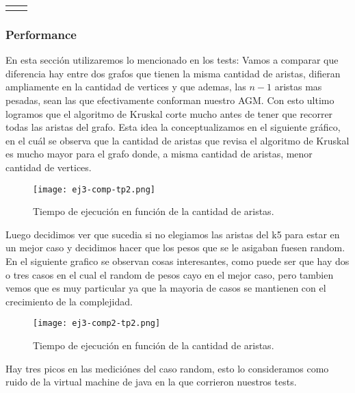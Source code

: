     
    \begin{tabular}{ l c }
    &  \\
\end{tabular}
    
    
    
\pagebreak
\subsubsection{Performance}
En esta secci\'on utilizaremos lo mencionado en los tests: Vamos a comparar que diferencia hay entre dos grafos que tienen la misma cantidad de aristas, difieran ampliamente en la cantidad de vertices y que ademas, las  $n-1$ aristas mas pesadas, sean las que efectivamente conforman nuestro AGM. Con esto ultimo logramos que el algoritmo de Kruskal corte mucho antes de tener que recorrer todas las aristas del grafo.
Esta idea la conceptualizamos en el siguiente gr\'afico, en el cu\'al se observa que la cantidad de aristas que revisa el algoritmo de Kruskal es mucho mayor para el grafo donde, a misma cantidad de aristas, menor cantidad de vertices.\\

\begin{figure}[h!]
\texttt{[image: ej3-comp-tp2.png]}
\centering
\caption{Tiempo de ejecuci\'on en funci\'on de la cantidad de aristas.}
\label{overflow3}
\end{figure}

\pagebreak
Luego decidimos ver que sucedia si no elegiamos las aristas del k5 para estar en un mejor caso y decidimos hacer que los pesos que se le asigaban fuesen random. En el siguiente grafico se observan cosas interesantes, como puede ser que hay dos o tres casos en el cual el random de pesos cayo en el mejor caso, pero tambien vemos que es muy particular ya que la mayoria de casos se mantienen con el crecimiento de la complejidad. 
\begin{figure}[h!]
\texttt{[image: ej3-comp2-tp2.png]}
\centering
\caption{Tiempo de ejecuci\'on en funci\'on de la cantidad de aristas.}
\label{overflow3}
\end{figure}

Hay tres picos en las medici\'ones del caso random, esto lo consideramos como ruido de la virtual machine de java en la que corrieron nuestros tests.


